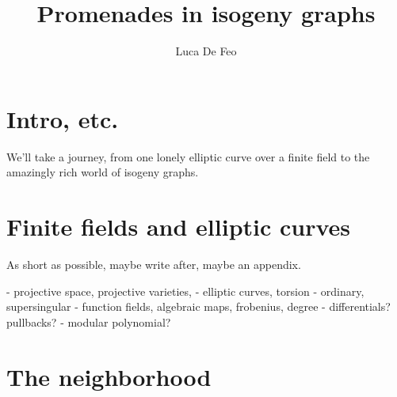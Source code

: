 \documentclass{report}
\title{Promenades in isogeny graphs}
\author{Luca De Feo}
\theoremstyle{plain}
\theoremstyle{definition}
\begin{document}
\maketitle
\thispagestyle{fancy}
\renewcommand{\headrulewidth}{0pt}
\renewcommand{\footrulewidth}{0.4pt}
\cfoot{\doclicenseThis}


\chapter{Intro, etc.}

We'll take a journey, from one lonely elliptic curve over a finite
field to the amazingly rich world of isogeny graphs.


\chapter{Finite fields and elliptic curves}

As short as possible, maybe write after, maybe an appendix.

- projective space, projective varieties,
- elliptic curves, torsion
- ordinary, supersingular
- function fields, algebraic maps, frobenius, degree
- differentials? pullbacks?
- modular polynomial?


\chapter{The neighborhood}

%

\end{document}
